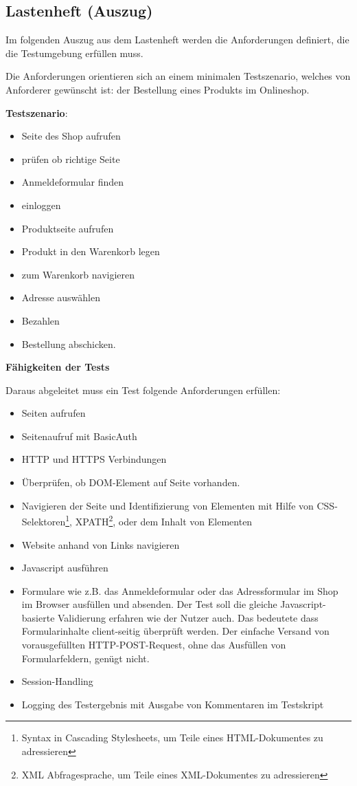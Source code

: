 \subsection{Lastenheft (Auszug)}
\label{app:Lastenheft}

Im folgenden Auszug aus dem Lastenheft werden die Anforderungen
definiert, die die Testumgebung erfüllen muss.

Die Anforderungen orientieren sich an einem minimalen Testszenario,
welches von Anforderer gewünscht ist: der Bestellung eines Produkts im
Onlineshop.

\textbf{Testszenario}:

\begin{itemize}
\itemsep1pt\parskip0pt
\item
  Seite des Shop aufrufen
\item
  prüfen ob richtige Seite
\item
  Anmeldeformular finden
\item
  einloggen
\item
  Produktseite aufrufen
\item
  Produkt in den Warenkorb legen
\item
  zum Warenkorb navigieren
\item
  Adresse auswählen
\item
  Bezahlen
\item
  Bestellung abschicken.
\end{itemize}

\textbf{Fähigkeiten der Tests}

Daraus abgeleitet muss ein Test folgende Anforderungen erfüllen:

\begin{itemize}
\itemsep1pt\parskip0pt
\item
  Seiten aufrufen
\item
  Seitenaufruf mit BasicAuth
\item
  HTTP und HTTPS Verbindungen
\item
  Überprüfen, ob DOM-Element auf Seite vorhanden.
\item
  Navigieren der Seite und Identifizierung von Elementen mit Hilfe von
  CSS-Selektoren\footnote{Syntax in Cascading Stylesheets, um Teile
    eines HTML-Dokumentes zu adressieren }, XPATH\footnote{XML
    Abfragesprache, um Teile eines XML-Dokumentes zu adressieren}, oder
  dem Inhalt von Elementen
\item
  Website anhand von Links navigieren
\item
  Javascript ausführen
\item
  Formulare wie z.B. das Anmeldeformular oder das Adressformular im Shop
  im Browser ausfüllen und absenden. Der Test soll die gleiche
  Javascript-basierte Validierung erfahren wie der Nutzer auch. Das
  bedeutete dass Formularinhalte client-seitig überprüft werden. Der
  einfache Versand von vorausgefüllten HTTP-POST-Request, ohne das
  Ausfüllen von Formularfeldern, genügt nicht.
\item
  Session-Handling
\item
  Logging des Testergebnis mit Ausgabe von Kommentaren im Testskript
\end{itemize}


